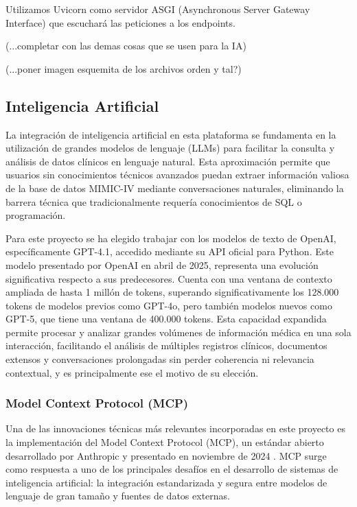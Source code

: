 Utilizamos Uvicorn como servidor ASGI (Asynchronous Server Gateway Interface) que escuchará las peticiones a los endpoints. 

(...completar con las demas cosas que se usen para la IA)

(...poner imagen esquemita de los archivos orden y tal?)


\subsection{Inteligencia Artificial}

La integración de inteligencia artificial en esta plataforma se fundamenta en la utilización de grandes modelos de lenguaje (LLMs) para facilitar la consulta y análisis de datos clínicos en lenguaje natural. Esta aproximación permite que usuarios sin conocimientos técnicos avanzados puedan extraer información valiosa de la base de datos MIMIC-IV mediante conversaciones naturales, eliminando la barrera técnica que tradicionalmente requería conocimientos de SQL o programación.

Para este proyecto se ha elegido trabajar con los modelos de texto de OpenAI, específicamente GPT-4.1, accedido mediante su API oficial para Python. Este modelo presentado por OpenAI en abril de 2025, representa una evolución significativa respecto a sus predecesores. Cuenta con una ventana de contexto ampliada de hasta 1 millón de tokens, superando significativamente los 128.000 tokens de modelos previos como GPT-4o, pero también modelos nuevos como GPT-5, que tiene una ventana de 400.000 tokens. Esta capacidad expandida permite procesar y analizar grandes volúmenes de información médica en una sola interacción, facilitando el análisis de múltiples registros clínicos, documentos extensos y conversaciones prolongadas sin perder coherencia ni relevancia contextual, y es principalmente ese el motivo de su elección.

\subsubsection{Model Context Protocol (MCP)}

Una de las innovaciones técnicas más relevantes incorporadas en este proyecto es la implementación del Model Context Protocol (MCP), un estándar abierto desarrollado por Anthropic y presentado en noviembre de 2024 \cite{AnthropicMCP2024}. MCP surge como respuesta a uno de los principales desafíos en el desarrollo de sistemas de inteligencia artificial: la integración estandarizada y segura entre modelos de lenguaje de gran tamaño y fuentes de datos externas.


